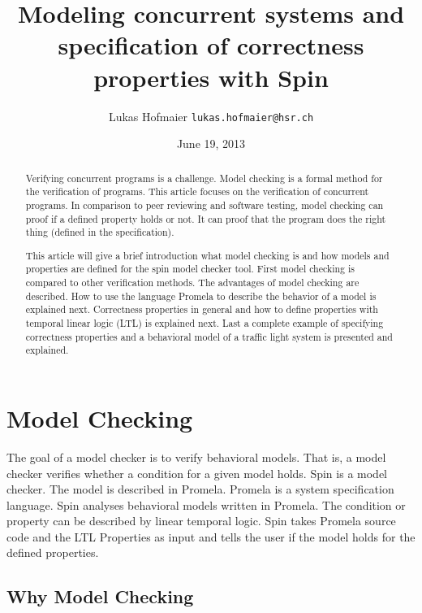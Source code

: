 \documentclass[12pt,a4paper,twoside]{article}
\begin{document}
\lstset{
basicstyle=\small\ttfamily,
xleftmargin=3.5em,
language=Promela,
captionpos=b
}

\title{Modeling concurrent systems and specification of correctness properties with Spin}
\author{Lukas Hofmaier \texttt{lukas.hofmaier@hsr.ch}}
\date{June 19, 2013}

\maketitle

\begin{abstract}
  Verifying concurrent programs is a challenge. Model checking is a formal method for the verification of programs. This article focuses on the verification of concurrent programs. In comparison to peer reviewing and software testing, model checking can proof if a defined property holds or not. It can proof that the program does the right thing (defined in the specification).

This article will give a brief introduction what model checking is and how models and properties are defined for the spin model checker tool. First model checking is compared to other verification methods. The advantages of model checking are described.  How to use the language Promela to describe the behavior of a model is explained next. Correctness properties in general and how to define properties with temporal linear logic (LTL) is explained next. Last a complete example of specifying correctness properties and a behavioral model of a traffic light system is presented and explained.
\end{abstract}

\section{Model Checking}
\label{sec:modelchecking}

The goal of a model checker is to verify behavioral models. That is, a model checker verifies whether a condition for a given model holds. Spin is a model checker. The model is described in Promela. Promela is a system specification language. Spin analyses behavioral models written in Promela. The condition or property can be described by linear temporal logic.  Spin takes Promela source code and the LTL Properties as input and tells the user if the model holds for the defined properties.

\subsection{Why Model Checking}
\label{sec:why}
\end{document}
